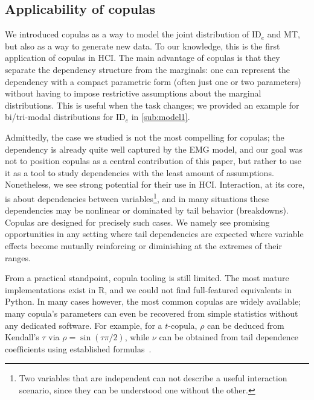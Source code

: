 \documentclass[acmlarge, manuscript,review]{acmart}
\newcommand{\ide}{\ensuremath{{\text{ID}_e}}\xspace}
\begin{document}
\subsection{Applicability of copulas}
We introduced copulas as a way to model the joint distribution of \ide and MT, but also as a way to generate new data. To our knowledge, this is the first application of copulas in HCI. The main advantage of copulas is that they separate the dependency structure from the marginals: one can represent the dependency with a compact parametric form (often just one or two parameters) without having to impose restrictive assumptions about the marginal distributions. This is useful when the task changes; we provided an example for bi/tri-modal distributions for \ide in \autoref{sub:model1}.

Admittedly, the case we studied is not the most compelling for copulas; the dependency is already quite well captured by the EMG model, and our goal was not to position copulas as a central contribution of this paper, but rather to use it as a tool to study dependencies with the least amount of assumptions. Nonetheless, we see strong potential for their use in HCI. Interaction, at its core, is about dependencies between variables\footnote{Two variables that are independent can not describe a useful interaction scenario, since they can be understood one without the other.}, and in many situations these dependencies may be nonlinear or dominated by tail behavior (\eg breakdowns). Copulas are designed for precisely such cases. We namely see promising opportunities %
in any setting where tail dependencies are expected \ie where variable effects become mutually reinforcing or diminishing at the extremes of their ranges.

From a practical standpoint, copula tooling is still limited. The most mature implementations exist in R, and we could not find full-featured equivalents in Python.  %
In many cases however, the most common copulas are widely available; many copula's parameters can even be recovered from simple statistics without any dedicated software. For example, for a $t$-copula, $\rho$ can be deduced from Kendall's $\tau$ via $\rho = \sin(\tau \pi/2)$, while $\nu$ can be obtained from tail dependence coefficients using established formulas~\cite[Section 3]{demarta2005}.
\end{document}
